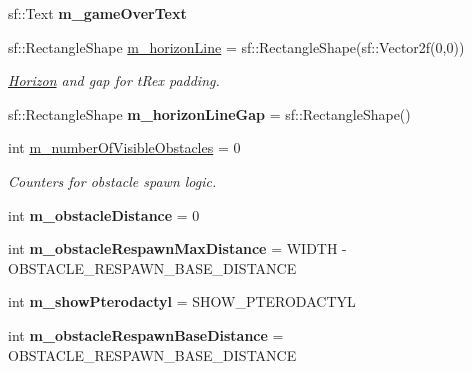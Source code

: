 \begin{DoxyCompactItemize}
sf\+::\+Text {\bfseries m\+\_\+game\+Over\+Text}
\item 
\mbox{\label{class_game_a7a382d166c10579b4600f10a3569caf1}} 
sf\+::\+Rectangle\+Shape \mbox{\hyperlink{class_game_a7a382d166c10579b4600f10a3569caf1}{m\+\_\+horizon\+Line}} = sf\+::\+Rectangle\+Shape(sf\+::\+Vector2f(0,0))
\begin{DoxyCompactList}\small\item\em \mbox{\hyperlink{class_horizon}{Horizon}} and gap for t\+Rex padding. \end{DoxyCompactList}\item 
\mbox{\label{class_game_a3004ea5989d6af17ffcf8a522d95f903}} 
sf\+::\+Rectangle\+Shape {\bfseries m\+\_\+horizon\+Line\+Gap} = sf\+::\+Rectangle\+Shape()
\item 
\mbox{\label{class_game_a53330c83737c4a70bb70176366513c4e}} 
int \mbox{\hyperlink{class_game_a53330c83737c4a70bb70176366513c4e}{m\+\_\+number\+Of\+Visible\+Obstacles}} = 0
\begin{DoxyCompactList}\small\item\em Counters for obstacle spawn logic. \end{DoxyCompactList}\item 
\mbox{\label{class_game_aa5474cb131212bb7780484b4339c41c6}} 
int {\bfseries m\+\_\+obstacle\+Distance} = 0
\item 
\mbox{\label{class_game_ac8c8c486cb77ec0c9d0512bfc0f0a813}} 
int {\bfseries m\+\_\+obstacle\+Respawn\+Max\+Distance} = W\+I\+D\+TH -\/ O\+B\+S\+T\+A\+C\+L\+E\+\_\+\+R\+E\+S\+P\+A\+W\+N\+\_\+\+B\+A\+S\+E\+\_\+\+D\+I\+S\+T\+A\+N\+CE
\item 
\mbox{\label{class_game_a03216b2f3878a92b479e1a92a6f4d7f5}} 
int {\bfseries m\+\_\+show\+Pterodactyl} = S\+H\+O\+W\+\_\+\+P\+T\+E\+R\+O\+D\+A\+C\+T\+YL
\item 
\mbox{\label{class_game_a2cf153630e23e8a7d57981112655ec91}} 
int {\bfseries m\+\_\+obstacle\+Respawn\+Base\+Distance} = O\+B\+S\+T\+A\+C\+L\+E\+\_\+\+R\+E\+S\+P\+A\+W\+N\+\_\+\+B\+A\+S\+E\+\_\+\+D\+I\+S\+T\+A\+N\+CE
\item 
\mbox{\label{class_game_a9392c71ce938005dd5f201997ce80de6}} 

\end{DoxyCompactItemize}
